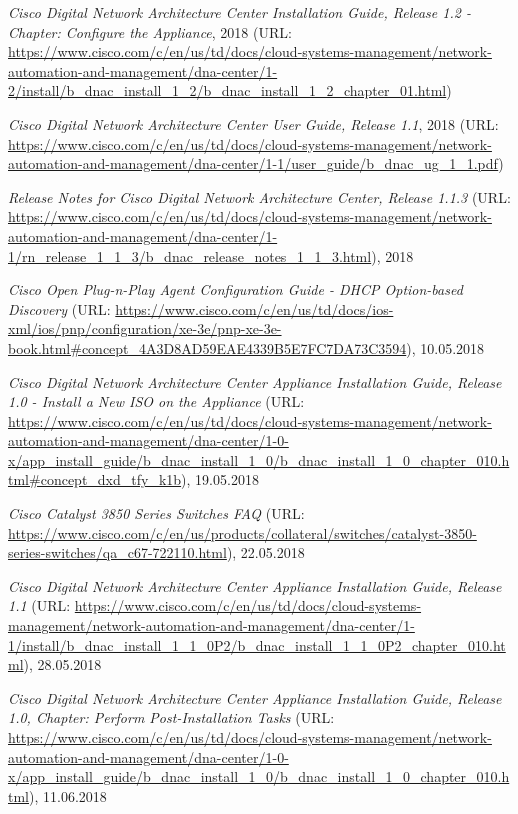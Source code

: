 \begin{thebibliography}{}
	 \textit{Cisco Digital Network Architecture Center Installation Guide, Release 1.2 - Chapter: Configure the Appliance}, 2018 (URL: \url{https://www.cisco.com/c/en/us/td/docs/cloud-systems-management/network-automation-and-management/dna-center/1-2/install/b_dnac_install_1_2/b_dnac_install_1_2_chapter_01.html})

	 \textit{Cisco Digital Network Architecture Center User Guide, Release 1.1}, 2018 (URL: \url{https://www.cisco.com/c/en/us/td/docs/cloud-systems-management/network-automation-and-management/dna-center/1-1/user_guide/b_dnac_ug_1_1.pdf})
	
	 \textit{Release Notes for Cisco Digital Network Architecture Center, Release 1.1.3} (URL: \url{https://www.cisco.com/c/en/us/td/docs/cloud-systems-management/network-automation-and-management/dna-center/1-1/rn_release_1_1_3/b_dnac_release_notes_1_1_3.html}), 2018
	
	 \textit{Cisco Open Plug-n-Play Agent Configuration Guide - DHCP Option-based Discovery} (URL: \url{https://www.cisco.com/c/en/us/td/docs/ios-xml/ios/pnp/configuration/xe-3e/pnp-xe-3e-book.html#concept_4A3D8AD59EAE4339B5E7FC7DA73C3594}), 10.05.2018
	
	 \textit{Cisco Digital Network Architecture Center Appliance Installation Guide, Release 1.0 - Install a New ISO on the Appliance
	} (URL: \url{https://www.cisco.com/c/en/us/td/docs/cloud-systems-management/network-automation-and-management/dna-center/1-0-x/app_install_guide/b_dnac_install_1_0/b_dnac_install_1_0_chapter_010.html#concept_dxd_tfy_k1b}), 19.05.2018

	 \textit{Cisco Catalyst 3850 Series Switches FAQ} (URL: \url{https://www.cisco.com/c/en/us/products/collateral/switches/catalyst-3850-series-switches/qa_c67-722110.html}), 22.05.2018	

	 \textit{Cisco Digital Network Architecture Center Appliance Installation Guide, Release 1.1} (URL: \url{https://www.cisco.com/c/en/us/td/docs/cloud-systems-management/network-automation-and-management/dna-center/1-1/install/b_dnac_install_1_1_0P2/b_dnac_install_1_1_0P2_chapter_010.html}), 28.05.2018
	
	 \textit{Cisco Digital Network Architecture Center Appliance Installation Guide, Release 1.0, Chapter: Perform Post-Installation Tasks} (URL: \url{https://www.cisco.com/c/en/us/td/docs/cloud-systems-management/network-automation-and-management/dna-center/1-0-x/app_install_guide/b_dnac_install_1_0/b_dnac_install_1_0_chapter_010.html}), 11.06.2018
	

\end{thebibliography}
